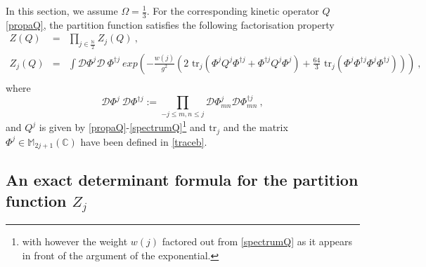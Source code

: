 \documentclass[a4paper,11pt,twoside]{article}
\numberwithin{equation}{section}
\theoremstyle{nonumberplain}
\newcounter{and}
\begin{document}
In this section, we assume $\Omega=\frac{1}{3}$. For the corresponding kinetic operator $Q$ \eqref{propaQ}, the partition function satisfies the following factorisation property%
%
\begin{eqnarray}
Z(Q) &=& \prod_{j\in\frac{\mathbb{N}}{2}} Z_j(Q) \ , \label{zq} \\
Z_j(Q) &=& \int{\mathcal{D}} \Phi^j \mathcal{D} \ \Phi^{\dag j} \ exp\left(-\frac{w(j)}{g^2} \left( 2 \mbox{ tr}_j\left(\Phi^j Q^j\Phi^{\dag j}+\Phi^{\dag j} Q^j\Phi^j\right)+\frac{64}{3}\mbox{ tr}_j\left(\Phi^j\Phi^{\dag j}\Phi^j\Phi^{\dag j}\right) \right)\right) \ , \label{zqj} \nonumber \\
\end{eqnarray}
%
where%
%
\begin{equation}
\mathcal{D} \Phi^j \ \mathcal{D} \Phi^{\dag j} := \prod_{-j\le m,n\le j} \mathcal{D} \Phi^j_{mn} \mathcal{D} \Phi^{\dag j}_{mn} \ , \label{measure}
\end{equation}
%
and $Q^j$ is given by \eqref{propaQ}-\eqref{spectrumQ}{\footnote{with however the weight $w(j)$ factored out from \eqref{spectrumQ} as it appears in front of the argument of the exponential.}} and $\mbox{tr}_j$ and the matrix $\Phi^j\in\mathbb{M}_{2j+1}(\mathbb{C})$ have been defined in \eqref{traceb}.\par%

\subsection{\texorpdfstring{An exact determinant formula for the partition function $Z_j$}{Exact partition function}}\label{subsection41}
\end{document}
